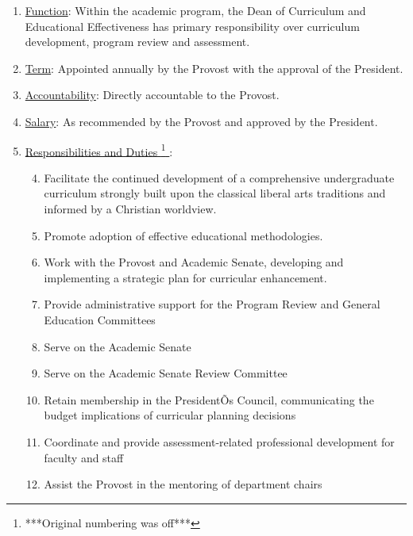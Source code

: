 \documentclass[letterpaper, 11pt]{article}
\newcounter{subsubparagraph}
\newcommand{\fix}[1]{\footnote{***#1***}}
\begin{document}
					\begin{enumerate}[label=\alph*)]
						\item{\underline{Function}:  Within the academic program, the Dean of Curriculum and Educational Effectiveness has primary responsibility over curriculum development, program review and assessment.}
						\item{\underline{Term}:  Appointed annually by the Provost with the approval of the President.}
						\item{\underline{Accountability}:  Directly accountable to the Provost.}
						\item{\underline{Salary}:  As recommended by the Provost and approved by the President.}
						\item{\underline{Responsibilities and Duties
								\fix{Original numbering was off}
							}:

							\begin{enumerate}[label=\arabic*)]
								\setcounter{enumii}{3}
								\item{Facilitate the continued development of a comprehensive undergraduate curriculum strongly built upon the classical liberal arts traditions and informed by a Christian worldview.}
								\item{Promote adoption of effective educational methodologies.}
								\item{Work with the Provost and Academic Senate, developing and implementing a strategic plan for curricular enhancement.}
								\item{Provide administrative support for the Program Review and General Education Committees}
								\item{Serve on the Academic Senate}
								\item{Serve on the Academic Senate Review Committee}
								\item{ Retain membership in the PresidentÕs Council, communicating the budget implications of curricular planning decisions}
								\item{ Coordinate and provide assessment-related professional development for faculty and staff}
								\item{ Assist the Provost in the mentoring of department chairs}
							\end{enumerate}
						}
					\end{enumerate}
\end{document}
